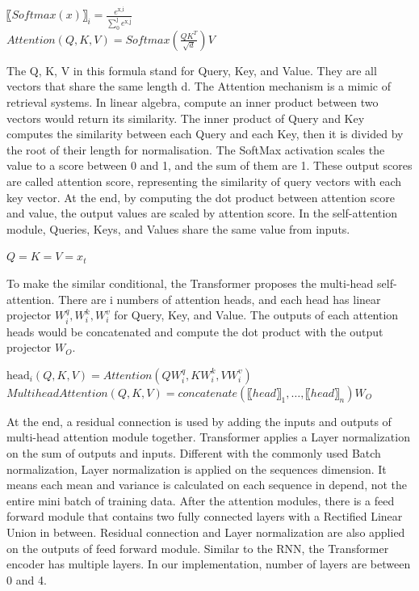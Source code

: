 \begin{center}

\(〖Softmax(x)〗_i=\frac{e^\text{x_i}}{\sum_0^\text{j}e^\text{x_j}}\)
\\
\(Attention(Q,K,V)=Softmax(\frac{QK^T}{\sqrt{d}})V\)
\end{center}

The Q, K, V in this formula stand for Query, Key, and Value. They are all vectors that share the same length d. The Attention mechanism is a mimic of retrieval systems. In linear algebra, compute an inner product between two vectors would return its similarity. The inner product of Query and Key computes the similarity between each Query and each Key, then it is divided by the root of their length for normalisation. The SoftMax activation scales the value to a score between 0 and 1, and the sum of them are 1. These output scores are called attention score, representing the similarity of query vectors with each key vector. At the end, by computing the dot product between attention score and value, the output values are scaled by attention score.
In the self-attention module, Queries, Keys, and Values share the same value from inputs.

\begin{center}
\(Q=K=V=x_t\) 
\end{center}

To make the similar conditional, the Transformer proposes the multi-head self-attention. There are i numbers of attention heads, and each head has linear projector \(W_i^q,W_i^k,W_i^v\) for Query, Key, and Value. The outputs of each attention heads would be concatenated and compute the dot product with the output projector \(W_O\). 

\begin{center}
\(\text{head}_i (Q,K,V)= Attention(QW_i^q,KW_i^k,VW_i^v)\)
\\\(Multihead Attention(Q,K,V)=concatenate(〖head〗_1,…,〖head〗_n)W_O\)
\end{center}

At the end, a residual connection is used by adding the inputs and outputs of multi-head attention module together. Transformer applies a Layer normalization on the sum of outputs and inputs. Different with the commonly used Batch normalization, Layer normalization is applied on the sequences dimension. It means each mean and variance is calculated on each sequence in depend, not the entire mini batch of training data. After the attention modules, there is a feed forward module that contains two fully connected layers with a Rectified Linear Union in between. Residual connection and Layer normalization are also applied on the outputs of feed forward module. Similar to the RNN, the Transformer encoder has multiple layers. In our implementation, number of layers are between 0 and 4.

